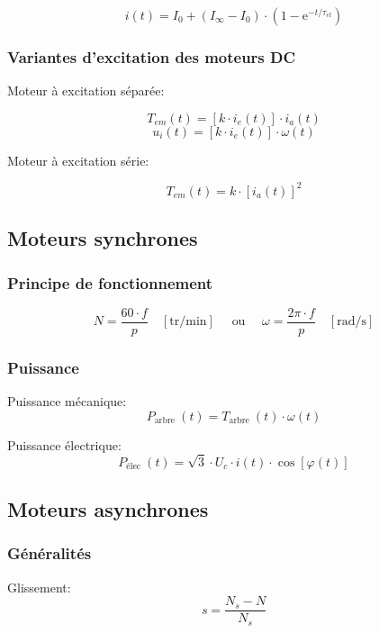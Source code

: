 \documentclass[10pt]{article} %
\begin{document}
\begin{multicols}{3}
\begin{flushleft}
				\[i(t)=I_{0}+\left(I_{\infty}-I_{0}\right) \cdot\left(1-\mathrm{e}^{-t / \tau_{e l}}\right)\]
				
			\subsubsection*{Variantes d'excitation des moteurs DC}
				
				Moteur à excitation séparée:
				
				\[T_{e m}(t)=\left[k \cdot i_{e}(t)\right] \cdot i_{a}(t)\]
				\[u_{i}(t)=\left[k \cdot i_{e}(t)\right] \cdot \omega(t)\]
				
				Moteur à excitation série:
				
				\[T_{e m}(t)=k \cdot\left[i_{a}(t)\right]^{2}\]
				
		\subsection*{Moteurs synchrones}
		
			\subsubsection*{Principe de fonctionnement}
				
				\[N=\frac{60 \cdot f}{p} \quad[\mathrm{tr} / \mathrm{min}] \quad \text { ou } \quad \omega=\frac{2 \pi \cdot f}{p} \quad[\mathrm{rad} / \mathrm{s}]\]
			
			\subsubsection*{Puissance}
				
				Puissance mécanique:
				\[P_{\text {arbre }}(t)=T_{\text {arbre }}(t) \cdot \omega(t)\]
				
				Puissance électrique:
				\[P_{\text {élec }}(t)=\sqrt{3} \cdot U_{c} \cdot i(t) \cdot \cos [\varphi(t)]\]
		
		\subsection*{Moteurs asynchrones}
		
			\subsubsection*{Généralités}
				
				Glissement:
				\[s=\frac{N_{s}-N}{N_{s}}\]
				

\end{flushleft}
\end{multicols}
\end{document}
